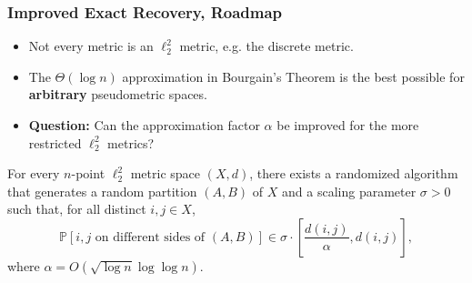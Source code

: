 \documentclass{beamer}
\newcommand{\PP}{\mathbb{P}}
\begin{document}
    \begin{frame}
        \frametitle{Improved Exact Recovery, Roadmap}

        \begin{itemize}
            \item Not every metric is an $\ell_2^2$ metric, e.g. the discrete metric. \pause
            \item The $\Theta(\log n)$ approximation in Bourgain's Theorem is the best possible for {\bf arbitrary} pseudometric spaces. \pause
            \item {\bf Question:} Can the approximation factor $\alpha$ be improved for the more restricted $\ell_2^2$ metrics?
        \end{itemize}

        \pause
    
        \begin{theorem}
            For every $n$-point $\ell_2^2$ metric space $(X, d)$, there exists a randomized algorithm that generates a random partition $(A, B)$ of $X$ and a scaling parameter $\sigma > 0$ such that, for all distinct $i, j \in X$,
            $$ \PP[\text{$i, j$ on different sides of $(A, B)$}] \in \sigma \cdot \left[\frac{d(i, j)}{\alpha}, d(i, j)\right], $$
            where $\alpha = O(\sqrt{\log n} \log \log n)$.
        \end{theorem}
    \end{frame}
\end{document}
